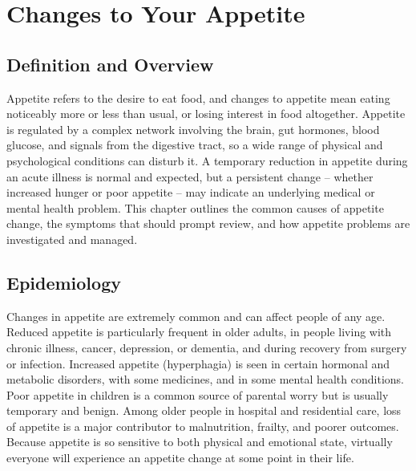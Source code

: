 \chapter{Changes to Your Appetite}

\section*{Definition and Overview}
Appetite refers to the desire to eat food, and changes to appetite mean eating noticeably more or less than usual, or losing interest in food altogether. Appetite is regulated by a complex network involving the brain, gut hormones, blood glucose, and signals from the digestive tract, so a wide range of physical and psychological conditions can disturb it. A temporary reduction in appetite during an acute illness is normal and expected, but a persistent change -- whether increased hunger or poor appetite -- may indicate an underlying medical or mental health problem. This chapter outlines the common causes of appetite change, the symptoms that should prompt review, and how appetite problems are investigated and managed.

\section*{Epidemiology}
Changes in appetite are extremely common and can affect people of any age. Reduced appetite is particularly frequent in older adults, in people living with chronic illness, cancer, depression, or dementia, and during recovery from surgery or infection. Increased appetite (hyperphagia) is seen in certain hormonal and metabolic disorders, with some medicines, and in some mental health conditions. Poor appetite in children is a common source of parental worry but is usually temporary and benign. Among older people in hospital and residential care, loss of appetite is a major contributor to malnutrition, frailty, and poorer outcomes. Because appetite is so sensitive to both physical and emotional state, virtually everyone will experience an appetite change at some point in their life.

